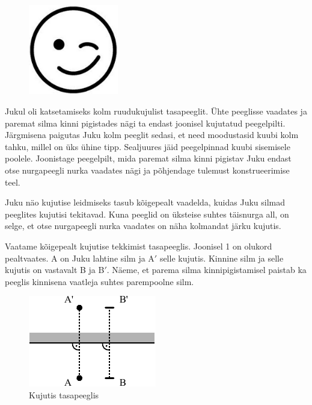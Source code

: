 
\begin{figure}
	\vspace{-25pt}
	\begin{center}
		\includegraphics[width=0.35\textwidth]{2016-v3g-08-wink.png}
	\end{center}
	\vspace{-20pt}
\end{figure}

Jukul oli katsetamiseks kolm ruudukujulist tasapeeglit. Ühte peeglisse vaadates ja paremat silma kinni pigistades nägi ta endast joonisel kujutatud peegelpilti. Järgmisena paigutas Juku kolm peeglit sedasi, et need moodustasid kuubi kolm tahku, millel on üks ühine tipp. Sealjuures jäid peegelpinnad kuubi sisemisele poolele. Joonistage peegelpilt, mida paremat silma kinni pigistav Juku endast otse nurgapeegli nurka vaadates nägi ja põhjendage tulemust konstrueerimise teel.

\hint
Juku näo kujutise leidmiseks tasub kõigepealt vaadelda, kuidas Juku silmad peeglites kujutisi tekitavad. Kuna peeglid on üksteise suhtes täisnurga all, on selge, et otse nurgapeegli nurka vaadates on näha kolmandat järku kujutis.

\solu
Vaatame kõigepealt kujutise tekkimist tasapeeglis. Joonisel 1 on olukord pealtvaates. A on Juku lahtine silm ja A$'$ selle kujutis. Kinnine silm ja selle kujutis on vastavalt B ja B$'$. Näeme, et parema silma kinnipigistamisel paistab ka peeglis kinnisena vaatleja suhtes parempoolne silm.
\begin{figure}[h]
	\centerline{\includegraphics[scale=1.2]{2016-v3g-08-nurgapeegel_j1}}
	\caption{Kujutis tasapeeglis}
\end{figure}

